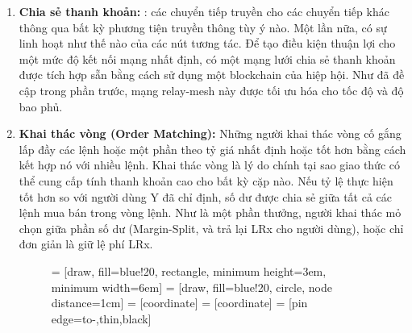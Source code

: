 \documentclass[12pt,a4paper]{article}
\begin{document}
\begin{multicols}{2}
\begin{enumerate}[topsep=-5pt,itemsep=1ex,partopsep=5ex,parsep=1ex]
\item \textbf{Chia sẻ thanh khoản: }: các chuyển tiếp truyền cho các chuyển tiếp khác thông qua bất kỳ phương tiện truyền thông tùy ý nào. Một lần nữa, có sự linh hoạt như thế nào của các nút tương tác. Để tạo điều kiện thuận lợi cho một mức độ kết nối mạng nhất định, có một mạng lưới chia sẻ thanh khoản được tích hợp sẵn bằng cách sử dụng một blockchain của hiệp hội. Như đã đề cập trong phần trước, mạng relay-mesh này được tối ưu hóa cho tốc độ và độ bao phủ.

\item \textbf{Khai thác vòng (Order Matching):  }Những người khai thác vòng cố gắng lấp đầy các lệnh hoặc một phần theo tỷ giá nhất định hoặc tốt hơn bằng cách kết hợp nó với nhiều lệnh. Khai thác vòng là lý do chính tại sao giao thức có thể cung cấp tính thanh khoản cao cho bất kỳ cặp nào. Nếu tỷ lệ thực hiện tốt hơn so với người dùng Y đã chỉ định, số dư được chia sẻ giữa tất cả các lệnh mua bán trong vòng lệnh. Như là một phần thưởng, người khai thác mỏ chọn giữa phần số dư (Margin-Split, và trả lại LRx cho người dùng), hoặc chỉ đơn giản là giữ lệ phí LRx.
\begin{center}

\begin{figure}[H]
\centering
{} = [draw, fill=blue!20, rectangle,
    minimum height=3em, minimum width=6em]
 = [draw, fill=blue!20, circle, node distance=1cm]
 = [coordinate]
 = [coordinate]
 = [pin edge={to-,thin,black}]

\begin{tikzpicture}[
    auto,
    scale=0.7,
    node distance=2cm,
    >=latex',
    font=\bfseries\footnotesize\sffamily,
    order/.style={
		rectangle,
		scale=0.7,
		rounded corners,
		draw=black,
		text centered,
		minimum height=12mm,
		minimum width=30mm,
		fill=white
	},
	role/.style={
		circle,
		scale=0.7,
		draw=black,
		text centered,
		minimum height=12mm,
		minimum width=12mm,
		fill=white
	},
	steps/.style={
		circle,
		scale=0.7,
		draw=black,
		text centered,
		fill=black,
		text=white
	},
	account/.style={
		circle,
		scale=0.7,
		draw=black,
		text centered,
		minimum height=16mm,
		minimum width=16mm,
		fill=white
	},
	label/.style={
	  scale=0.7
    }
  ]



\end{tikzpicture}
\end{figure}
\end{center}
\end{enumerate}
\end{multicols}
\end{document}

